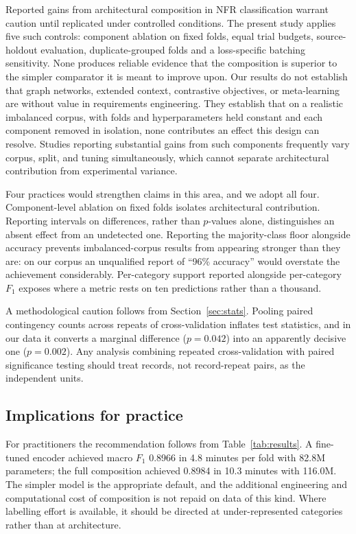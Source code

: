 \documentclass[11pt,a4paper]{article}
\begin{document}
Reported gains from architectural composition in NFR classification warrant caution until replicated
under controlled conditions. The present study applies five such controls: component ablation on fixed
folds, equal trial budgets, source-holdout evaluation, duplicate-grouped folds and a loss-specific
batching sensitivity. None produces reliable evidence that the composition is superior to the simpler
comparator it is meant to improve upon. Our results do not establish that graph networks,
extended context, contrastive objectives, or meta-learning are without value in
requirements engineering. They establish that on a realistic imbalanced corpus, with folds
and hyperparameters held constant and each component removed in isolation, none contributes
an effect this design can resolve. Studies reporting substantial gains from such components
frequently vary corpus, split, and tuning simultaneously, which cannot separate
architectural contribution from experimental variance.

Four practices would strengthen claims in this area, and we adopt all four. Component-level
ablation on fixed folds isolates architectural contribution. Reporting intervals on
differences, rather than $p$-values alone, distinguishes an absent effect from an
undetected one. Reporting the majority-class floor alongside accuracy prevents imbalanced-corpus results from appearing stronger than they are: on our corpus an unqualified report of ``96\% accuracy'' would overstate the achievement considerably. Per-category support reported alongside per-category $F_1$ exposes where a metric rests on ten predictions rather than a thousand.

A methodological caution follows from Section~\ref{sec:stats}. Pooling paired contingency
counts across repeats of cross-validation inflates test statistics, and in our data it
converts a marginal difference ($p = 0.042$) into an apparently decisive one
($p = 0.002$). Any analysis combining repeated cross-validation with paired significance
testing should treat records, not record-repeat pairs, as the independent units.

\subsection{Implications for practice}

For practitioners the recommendation follows from Table~\ref{tab:results}. A fine-tuned
encoder achieved macro $F_1$ 0.8966 in 4.8 minutes per fold with 82.8M parameters; the full
composition achieved 0.8984 in 10.3 minutes with 116.0M. The simpler model is the
appropriate default, and the additional engineering and computational cost of composition
is not repaid on data of this kind. Where labelling effort is available, it should be
directed at under-represented categories rather than at architecture.
\end{document}
